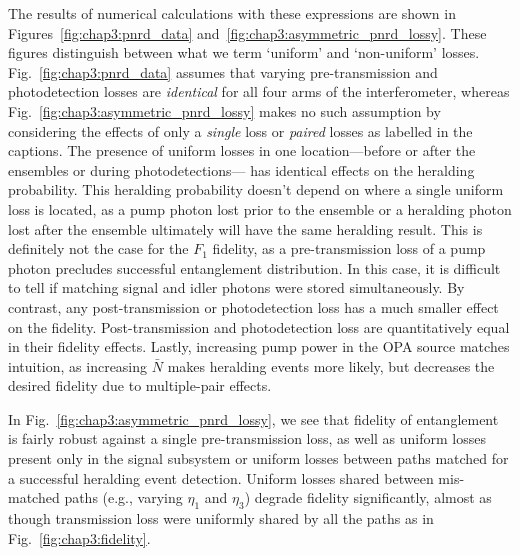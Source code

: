 \documentclass[aps,twocolumn,secnumarabic,amsmath,amssymb,pra,groupedaddress,
showpacs, showkeys,draft]{revtex4-1}
\begin{document}
The results of numerical calculations with these expressions are shown in
Figures~\ref{fig:chap3:pnrd_data}
and~\ref{fig:chap3:asymmetric_pnrd_lossy}. These figures distinguish between
what we term `uniform' and `non-uniform' losses. Fig.~\ref{fig:chap3:pnrd_data}
assumes that varying pre-transmission and photodetection losses are
\emph{identical} for all four arms of the interferometer, whereas
Fig.~\ref{fig:chap3:asymmetric_pnrd_lossy} makes no such assumption by
considering the effects of only a \emph{single} loss or \emph{paired} losses as
labelled in the captions. The presence of uniform losses in one
location---before or after the ensembles or during photodetections--- has
identical effects on the heralding probability. This heralding probability
doesn't depend on where a single uniform loss is located, as a pump photon lost
prior to the ensemble or a heralding photon lost after the ensemble ultimately
will have the same heralding result. This is definitely not the case for the
$F_1$ fidelity, as a pre-transmission loss of a pump photon precludes
successful entanglement distribution. In this case, it is difficult to tell if
matching signal and idler photons were stored simultaneously. By contrast, any
post-transmission or photodetection loss has a much smaller effect on the
fidelity. Post-transmission and photodetection loss are quantitatively equal in
their fidelity effects. Lastly, increasing pump power in the OPA source matches
intuition, as increasing $\bar{N}$ makes heralding events more likely, but
decreases the desired fidelity due to multiple-pair effects. 

In Fig.~\ref{fig:chap3:asymmetric_pnrd_lossy}, we see that fidelity of
entanglement is fairly robust against a single pre-transmission loss, as well
as uniform losses present only in the signal subsystem or uniform losses
between paths matched for a successful heralding event detection. Uniform
losses shared between mis-matched paths (e.g., varying $\eta_1$ and $\eta_3$)
degrade fidelity significantly, almost as though transmission loss were
uniformly shared by all the paths as in Fig.~\ref{fig:chap3:fidelity}. 
\end{document}
